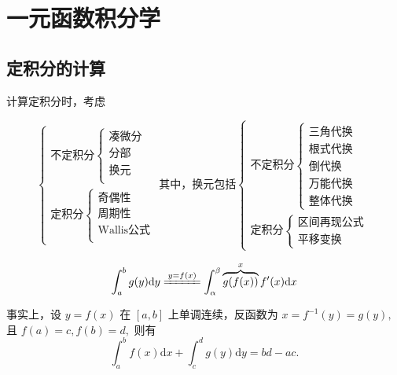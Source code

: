 \chapter{一元函数积分学}

\section{定积分的计算}

计算定积分时，考虑

$$
\begin{cases}
    \textrm{不定积分}\begin{cases}
        \textrm{凑微分}\\ 
        \textrm{分部}\\ 
        \textrm{换元}\\     
    \end{cases}\\
    \textrm{定积分}\begin{cases}
        \textrm{奇偶性}\\
        \textrm{周期性}\\ 
        \textrm{Wallis公式} \\    
    \end{cases}    
\end{cases}
\textrm{其中，换元包括}
\begin{cases}
    \textrm{不定积分}
    \begin{cases}
        \textrm{三角代换}\\\textrm{根式代换}\\\textrm{倒代换}\\\textrm{万能代换}\\\textrm{整体代换}    
    \end{cases}\\\textrm{定积分}    
    \begin{cases}
        \textrm{区间再现公式}\\\textrm{平移变换}
    \end{cases}
\end{cases}
$$


$$
    \int_a^b g(y)\mathrm{d}y \xlongequal{y = f(x)}
    \int_\alpha^\beta \overbrace{g(f(x))}^{x}f'(x)\mathrm{d}x
$$

事实上，设 $ y = f(x) $ 在 $ [a,b] $ 上单调连续，反函数为 $ x = f^{-1}(y) = g(y), $ 
且 $ f(a) = c, f(b) = d, $ 
则有
$$
    \int_a^bf(x)\mathrm{d}x + \int_c^d g(y)\mathrm{d}y = bd - ac.
$$

